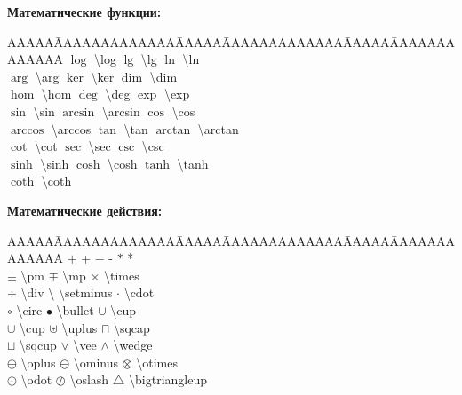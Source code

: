 \documentclass[a4paper,14pt,russian]{extreport}
\begin{document}
\textbf{Математические функции:} 
\begin{tabbing}
AAAAA\= AAAAAAAAAAAAA\= AAAAA\= AAAAAAAAAAAAA\= AAAAA\= AAAAAAAAAAAAA \kill
$\log$ \> \textbackslash log \> $\lg$ \> \textbackslash lg \> $\ln$ \> \textbackslash ln\\
$\arg$ \> \textbackslash arg \> $\ker$ \> \textbackslash ker \> $\dim$ \> \textbackslash dim\\
$\hom$ \> \textbackslash hom \> $\deg$ \> \textbackslash deg \> $\exp$ \> \textbackslash exp\\
$\sin$ \> \textbackslash sin \> $\arcsin$ \> \textbackslash arcsin \> $\cos$ \> \textbackslash cos\\
$\arccos$ \> \textbackslash arccos \> $\tan$ \> \textbackslash tan \> $\arctan$ \> \textbackslash arctan\\
$\cot$ \> \textbackslash cot \> $\sec$ \> \textbackslash sec \> $\csc$ \> \textbackslash csc \\
$\sinh$ \> \textbackslash sinh \> $\cosh$ \> \textbackslash cosh \> $\tanh$ \> \textbackslash tanh\\
$\coth$ \> \textbackslash coth\\
\end{tabbing}

\textbf{Математические действия:}
\begin{tabbing}
AAAAA\= AAAAAAAAAAAAA\= AAAAA\= AAAAAAAAAAAAA\= AAAAA\= AAAAAAAAAAAAA \kill
$+$\> + \> $-$ \> - \> $*$ \> * \\
$\pm$ \> \textbackslash pm \> $\mp$ \> \textbackslash mp \> $\times$ \> \textbackslash times\\
$\div$ \> \textbackslash div \> $\setminus$ \> \textbackslash setminus \> $\cdot$ \> \textbackslash cdot\\
$\circ$ \> \textbackslash circ \> $\bullet$ \> \textbackslash bullet \> $\cup$ \> \textbackslash cup\\
$\cup$ \> \textbackslash cup \> $\uplus$ \> \textbackslash uplus \> $\sqcap$ \> \textbackslash sqcap\\
$\sqcup$ \> \textbackslash sqcup \> $\vee$ \> \textbackslash vee \> $\wedge$ \> \textbackslash wedge\\
$\oplus$ \> \textbackslash oplus \> $\ominus$ \> \textbackslash ominus \> $\otimes$ \> \textbackslash otimes\\
$\odot$ \> \textbackslash odot\> $\oslash$ \> \textbackslash oslash\> $\bigtriangleup$ \> \textbackslash bigtriangleup\\
\end{tabbing}
\end{document}
